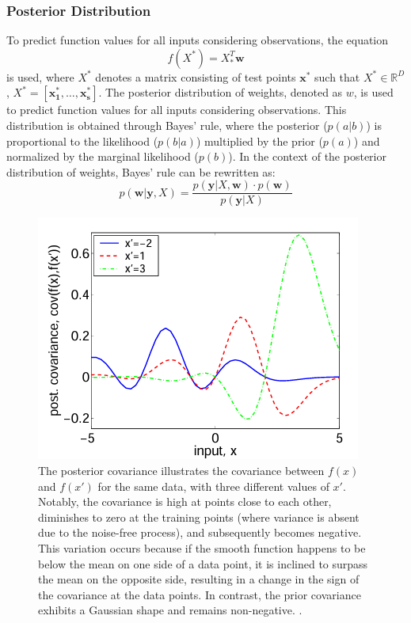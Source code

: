 \subsubsection{Posterior Distribution}
To predict function values for all inputs considering observations, the equation 
\begin{equation}
    f(X^*) = X^T_*\mathbf{w}
\end{equation} 
is used, where \( X^* \) denotes a matrix consisting of test points \( \mathbf{x^*} \) such that \( X^* \in \mathbb{R}^{D} \), \( X^* = [\mathbf{x^*_1, \ldots, x^*_s}] \). The posterior distribution of weights, denoted as $w$, is used to predict function values for all inputs considering observations. This distribution is obtained through Bayes' rule, where the posterior ($p(a|b)$) is proportional to the likelihood ($p(b|a)$) multiplied by the prior ($p(a)$) and normalized by the marginal likelihood ($p(b)$). In the context of the posterior distribution of weights, Bayes' rule can be rewritten as:
\begin{equation}\label{eq:bayes_rule}
    p(\mathbf{w}|\mathbf{y},X) = \frac{p(\mathbf{y}|X,\mathbf{w}) \cdot p(\mathbf{w})}{p(\mathbf{y}|X)}
\end{equation}

\begin{figure}
    \centering
    \includegraphics[width=0.6\linewidth]{figures/posterior_cov.png}
    \caption{The posterior covariance illustrates the covariance between \( f(x) \) and \( f(x') \) for the same data, with three different values of \( x' \). Notably, the covariance is high at points close to each other, diminishes to zero at the training points (where variance is absent due to the noise-free process), and subsequently becomes negative. This variation occurs because if the smooth function happens to be below the mean on one side of a data point, it is inclined to surpass the mean on the opposite side, resulting in a change in the sign of the covariance at the data points. In contrast, the prior covariance exhibits a Gaussian shape and remains non-negative. \cite{williams2006gaussian}.}
    \label{fig:Post_cov}
\end{figure}

